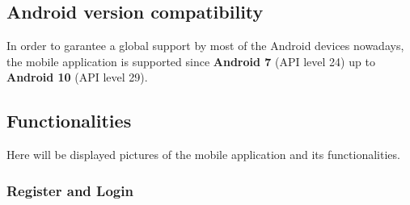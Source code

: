 \subsection{Android version compatibility}

In order to garantee a global support by most of the Android devices nowadays, the mobile application is supported since \textbf{Android 7} (API level 24)
up to \textbf{Android 10} (API level 29).

\subsection{Functionalities}

Here will be displayed pictures of the mobile application and its functionalities.\\

\subsubsection{Register and Login}

